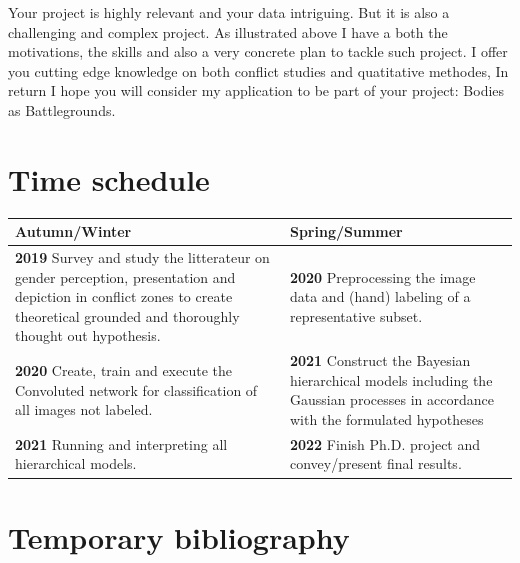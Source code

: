 \documentclass[a4paper]{article}
\begin{document}
Your project is highly relevant and your data intriguing. But it is also a challenging and complex project. As illustrated above I have a both the motivations, the skills and also a very concrete plan to tackle such project. I offer you cutting edge knowledge on both conflict studies and quatitative methodes, In return I hope you will consider my application to be part of your project: Bodies as Battlegrounds.\par



\pagebreak

\section{Time schedule} 

\begin{center}
\begin{tabular}{ m{7.5cm}| m{7.5cm} } 
    \textbf{Autumn/Winter}              & \textbf{Spring/Summer}\\
	\hline
    \textbf{2019} Survey and study the litterateur on gender perception, presentation and depiction in conflict zones to create theoretical grounded and thoroughly thought out hypothesis.
    & \textbf{2020} Preprocessing the image data and (hand) labeling of a representative subset.\\
    
    \hline
    \textbf{2020} Create, train and execute the Convoluted network for classification of all images not labeled.
    & \textbf{2021} Construct the Bayesian hierarchical models including the Gaussian processes in accordance with the formulated hypotheses\\
    
    \hline
    \textbf{2021} Running and interpreting all hierarchical models.
    & \textbf{2022} Finish Ph.D. project and convey/present final results.\\	

\end{tabular}
\end{center}
\pagebreak

\section{Temporary bibliography}
 

\end{document}
